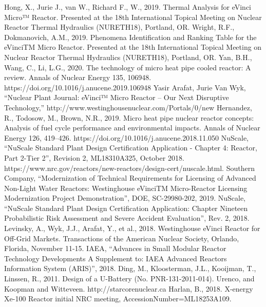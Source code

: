 \documentclass[10pt,a4paper]{article}
\begin{document}
\pagebreak
\begin{thebibliography}{X}
 Hong, X., Jurie J.,  van W., Richard F., W., 2019. Thermal Analysis for eVinci Micro™ Reactor. Presented at the 18th International Topical Meeting on Nuclear Reactor Thermal Hydraulics (NURETH18), Portland, OR.
 Wright, R.F., Dokmanovich, A.M., 2019. Phenomena Identification and Ranking Table for the eVinciTM Micro Reactor. Presented at the 18th International Topical Meeting on Nuclear Reactor Thermal Hydraulics (NURETH18), Portland, OR.
 Yan, B.H., Wang, C., Li, L.G., 2020. The technology of micro heat pipe cooled reactor: A review. Annals of Nuclear Energy 135, 106948. https://doi.org/10.1016/j.anucene.2019.106948
 Yasir Arafat, Jurie Van Wyk, “Nuclear Plant Journal: eVinci™ Micro Reactor – Our Next Disruptive Technology,” http://www.westinghousenuclear.com/Portals/0/new%
 Hernandez, R., Todosow, M., Brown, N.R., 2019. Micro heat pipe nuclear reactor concepts: Analysis of fuel cycle performance and environmental impacts. Annals of Nuclear Energy 126, 419–426. https://doi.org/10.1016/j.anucene.2018.11.050
 NuScale, “NuScale Standard Plant Design Certification Application - Chapter 4: Reactor, Part 2-Tier 2”, Revision 2, ML18310A325, October 2018. https://www.nrc.gov/reactors/new-reactors/design-cert/nuscale.html. 
 Southern Company, “Modernization of Technical Requirements for Licensing of Advanced Non-Light Water Reactors: Westinghouse eVinciTM Micro-Reactor Licensing Modernization Project Demonstration”, DOE, SC-29980-202, 2019.
 NuScale, “NuScale Standard Plant Design Certification Application: Chapter Nineteen Probabilistic Risk Assessment and Severe Accident Evaluation”, Rev. 2, 2018. 
 Levinsky, A., Wyk, J.J., Arafat, Y., et al., 2018. Westinghouse eVinci Reactor for Off-Grid Markets. Transactions of the American Nuclear Society, Orlando, Florida, November 11-15.
 IAEA, “Advances in Small Modular Reactor Technology Developments A Supplement to: IAEA Advanced Reactors Information System (ARIS)”, 2018. 
Ding, M., Kloosterman, J.L., Kooijman, T., Linssen, R., 2011. Design of a U-Battery (No. PNR-131-2011-014). Urenco, and Koopman and Witteveen.
 http://starcorenuclear.ca
 Harlan, B., 2018. X-energy Xe-100 Reactor initial NRC meeting, AccessionNumber=ML18253A109. 

\end{thebibliography}
\end{document}
